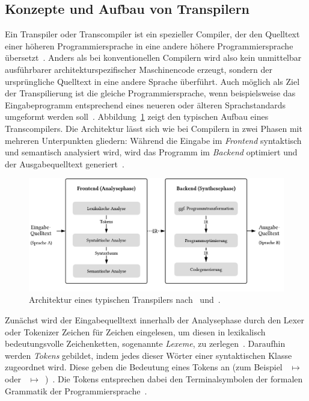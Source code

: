 \subsection{Konzepte und Aufbau von Transpilern}
\label{sec:transpiler-concepts}

Ein Transpiler oder Transcompiler ist ein spezieller Compiler, der den Quelltext einer höheren Programmiersprache in eine andere höhere Programmiersprache übersetzt~\autocite[3]{AHO:COMPILERS}. Anders als bei konventionellen Compilern wird also kein unmittelbar ausführbarer architekturspezifischer Maschinencode erzeugt, sondern der ursprüngliche Quelltext in eine andere Sprache überführt. Auch möglich als Ziel der Transpilierung ist die gleiche Programmiersprache, wenn beispielsweise das Eingabeprogramm entsprechend eines neueren oder älteren Sprachstandards umgeformt werden soll~\autocite{EVGENIY:2016}. Abbildung~\ref{fig:transpiler-architecture} zeigt den typischen Aufbau eines Transcompilers. Die Architektur lässt sich wie bei Compilern in zwei Phasen mit mehreren Unterpunkten gliedern: Während die Eingabe im \emph{Frontend} syntaktisch und semantisch analysiert wird, wird das Programm im \emph{Backend} optimiert und der Ausgabequelltext generiert~\autocite[136]{APPEL:2003}.

\bigbreak
\begin{figure}[htb]
  \includegraphics[width=\textwidth]{src/2_Grundlagen/fig/transpiler-architecture.pdf}
  \caption{Architektur eines typischen Transpilers nach~\autocite{EVGENIY:2016} und~\autocite[8]{TORCZON:2007}.}
	\label{fig:transpiler-architecture}
\end{figure}

Zunächst wird der Eingabequelltext innerhalb der Analysephase durch den Lexer oder Tokenizer Zeichen für Zeichen eingelesen, um diesen in lexikalisch bedeutungsvolle Zeichenketten, sogenannte \emph{Lexeme}, zu zerlegen~\autocite[43]{AHO:COMPILERS}. Daraufhin werden \emph{Tokens} gebildet, indem jedes dieser Wörter einer syntaktischen Klasse zugeordnet wird. Diese geben die Bedeutung eines Tokens an (zum Beispiel ~$\mapsto$~ oder \code{!=}~$\mapsto$~)~\autocite[26]{TORCZON:2007}. Die Tokens entsprechen dabei den Terminalsymbolen der formalen Grammatik der Programmiersprache~\autocite[43]{AHO:COMPILERS}.

